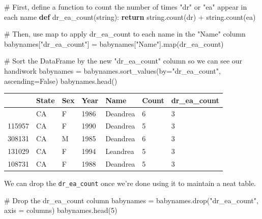 \documentclass[
  letterpaper,
  DIV=11,
  numbers=noendperiod]{scrreprt}
\newenvironment{Shaded}{\begin{snugshade}}{\end{snugshade}}
\newcommand{\BuiltInTok}[1]{\textcolor[rgb]{0.00,0.23,0.31}{#1}}
\newcommand{\CommentTok}[1]{\textcolor[rgb]{0.37,0.37,0.37}{#1}}
\newcommand{\ControlFlowTok}[1]{\textcolor[rgb]{0.00,0.23,0.31}{\textbf{#1}}}
\newcommand{\DecValTok}[1]{\textcolor[rgb]{0.68,0.00,0.00}{#1}}
\newcommand{\KeywordTok}[1]{\textcolor[rgb]{0.00,0.23,0.31}{\textbf{#1}}}
\newcommand{\NormalTok}[1]{\textcolor[rgb]{0.00,0.23,0.31}{#1}}
\newcommand{\OperatorTok}[1]{\textcolor[rgb]{0.37,0.37,0.37}{#1}}
\newcommand{\StringTok}[1]{\textcolor[rgb]{0.13,0.47,0.30}{#1}}
\newcommand{\VariableTok}[1]{\textcolor[rgb]{0.07,0.07,0.07}{#1}}
\begin{document}
\begin{Shaded}
\begin{Highlighting}[]
\CommentTok{\# First, define a function to count the number of times "dr" or "ea" appear in each name}
\KeywordTok{def}\NormalTok{ dr\_ea\_count(string):}
    \ControlFlowTok{return}\NormalTok{ string.count(}\StringTok{\textquotesingle{}dr\textquotesingle{}}\NormalTok{) }\OperatorTok{+}\NormalTok{ string.count(}\StringTok{\textquotesingle{}ea\textquotesingle{}}\NormalTok{)}

\CommentTok{\# Then, use \textasciigrave{}map\textasciigrave{} to apply \textasciigrave{}dr\_ea\_count\textasciigrave{} to each name in the "Name" column}
\NormalTok{babynames[}\StringTok{"dr\_ea\_count"}\NormalTok{] }\OperatorTok{=}\NormalTok{ babynames[}\StringTok{"Name"}\NormalTok{].}\BuiltInTok{map}\NormalTok{(dr\_ea\_count)}

\CommentTok{\# Sort the DataFrame by the new "dr\_ea\_count" column so we can see our handiwork}
\NormalTok{babynames }\OperatorTok{=}\NormalTok{ babynames.sort\_values(by}\OperatorTok{=}\StringTok{"dr\_ea\_count"}\NormalTok{, ascending}\OperatorTok{=}\VariableTok{False}\NormalTok{)}
\NormalTok{babynames.head()}
\end{Highlighting}
\end{Shaded}

\begin{longtable}[]{@{}lllllll@{}}
\toprule\noalign{}
& State & Sex & Year & Name & Count & dr\_ea\_count \\
\midrule\noalign{}
\endhead
\bottomrule\noalign{}
\endlastfoot
101976 & CA & F & 1986 & Deandrea & 6 & 3 \\
115957 & CA & F & 1990 & Deandrea & 5 & 3 \\
308131 & CA & M & 1985 & Deandrea & 6 & 3 \\
131029 & CA & F & 1994 & Leandrea & 5 & 3 \\
108731 & CA & F & 1988 & Deandrea & 5 & 3 \\
\end{longtable}

We can drop the \texttt{dr\_ea\_count} once we're done using it to
maintain a neat table.

\begin{Shaded}
\begin{Highlighting}[]
\CommentTok{\# Drop the \textasciigrave{}dr\_ea\_count\textasciigrave{} column}
\NormalTok{babynames }\OperatorTok{=}\NormalTok{ babynames.drop(}\StringTok{"dr\_ea\_count"}\NormalTok{, axis }\OperatorTok{=} \StringTok{\textquotesingle{}columns\textquotesingle{}}\NormalTok{)}
\NormalTok{babynames.head(}\DecValTok{5}\NormalTok{)}
\end{Highlighting}
\end{Shaded}
\end{document}
